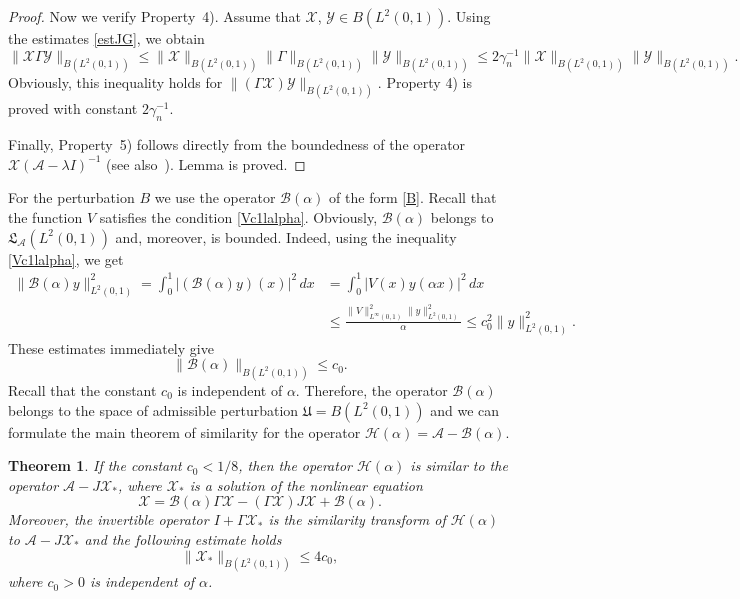 \documentclass[11pt,centertags,reqno,twoside]{amsart}
\numberwithin{equation}{section}
\newtheorem{theorem}{Theorem}
\theoremstyle{definition}
\theoremstyle{remark}
\begin{document}
\begin{proof}
Now we verify Property~4). Assume that $\mathcal{X}$, $\mathcal{Y}\in B(L^2(0, 1))$.
Using the estimates \eqref{estJG}, we obtain
\[
\|\mathcal{X}\Gamma\mathcal{Y}\|_{B(L^2(0, 1))}\leqslant \|\mathcal{X}\|_{B(L^2(0, 1))}
\|\Gamma\|_{B(L^2(0, 1))}\|\mathcal{Y}\|_{B(L^2(0, 1))}\leqslant
2\gamma_n^{-1}\|\mathcal{X}\|_{B(L^2(0, 1))}\|\mathcal{Y}\|_{B(L^2(0, 1))}.
\]
Obviously, this inequality holds for $\|(\Gamma\mathcal{X})\mathcal{Y}\|_{B(L^2(0, 1))}$.
Property 4) is proved with constant $2\gamma_n^{-1}$.

Finally, Property~5) follows directly from the boundedness of the operator
$\mathcal{X}(\mathcal{A}-\lambda I)^{-1}$ (see also~\cite[Definition~2.1]{BaskKrUsk}).
Lemma is proved.
\end{proof}

For the perturbation $B$ we use the operator $\mathcal{B}(\alpha)$ of the form \eqref{B}.
Recall that the function $V$ satisfies the condition \eqref{Vc1lalpha}.
Obviously, $\mathcal{B}(\alpha)$ belongs to $\mathfrak{L}_{\mathcal{A}}(L^2(0, 1))$ and,
moreover, is bounded. Indeed, using the inequality \eqref{Vc1lalpha}, we get
\begin{align*}
\|\mathcal{B}(\alpha)y\|^2_{L^2(0, 1)} = \int_0^1|(\mathcal{B}(\alpha)y)(x)|^2\,dx &=
\int_0^1|V(x)y(\alpha x)|^2\,dx \\
&\leqslant\frac{\|V\|_{L^\infty(0, 1)}^2
\|y\|^2_{L^2(0, 1)}}{\alpha}\leqslant c_0^2\|y\|^2_{L^2(0, 1)}.
\end{align*}
These estimates immediately give
\begin{equation}\label{estB}
\|\mathcal{B}(\alpha)\|_{B(L^2(0, 1))}\leqslant c_0.
\end{equation}
Recall that the constant $c_0$ is independent of $\alpha$. Therefore, the operator
$\mathcal{B}(\alpha)$ belongs to the space of admissible
perturbation $\mathfrak{U}=B(L^2(0, 1))$ and we can formulate the main theorem of
similarity for the operator $\mathcal{H}(\alpha)=\mathcal{A}-\mathcal{B}(\alpha)$.
\begin{theorem}\label{thmainsimil}
If the constant $c_0<1/8$, then the operator $\mathcal{H}(\alpha)$ is similar
to the operator $\mathcal{A}-J\mathcal{X}_*$, where $\mathcal{X}_*$ is a solution
of the nonlinear equation
\begin{equation}\label{mainEq}
\mathcal{X}=\mathcal{B}(\alpha)\Gamma\mathcal{X}-(\Gamma\mathcal{X})J\mathcal{X}
+\mathcal{B}(\alpha).
\end{equation}
Moreover, the invertible operator $I+\Gamma\mathcal{X}_*$ is the similarity transform
of $\mathcal{H}(\alpha)$ to $\mathcal{A}-J\mathcal{X}_*$ and the following estimate holds
\begin{equation}\label{x-b}
\|\mathcal{X}_*\|_{B(L^2(0, 1))}\leqslant 4c_0,
\end{equation}
where $c_0>0$ is independent of $\alpha$.
\end{theorem}
\end{document}
